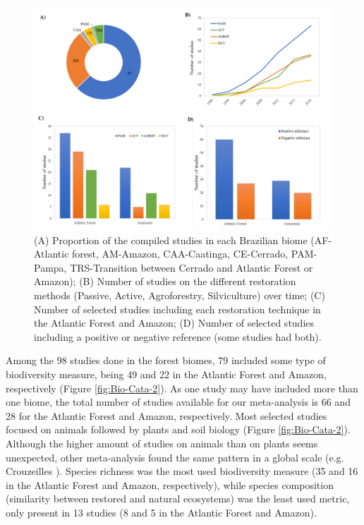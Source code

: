 %
\begin{figure}[H]
\includegraphics[width=1.0\linewidth]{pictureve/Bio-Cata-1.pdf}
\caption{(A) Proportion of the compiled studies in each Brazilian biome (AF-Atlantic forest, AM-Amazon, CAA-Caatinga, CE-Cerrado, PAM-Pampa, TRS-Transition between Cerrado and Atlantic Forest or Amazon); (B) Number of studies on the different restoration methods (Passive, Active, Agroforestry, Silviculture) over time; (C) Number of selected studies including each restoration technique in the Atlantic Forest and Amazon; (D) Number of selected studies including a positive or negative reference (some studies had both).}
\label{fig:Bio-Cata-1}
\end{figure}
%

\newpage
Among the 98 studies done in the forest biomes, 79 included some type of biodiversity measure, being 49 and 22 in the Atlantic Forest and Amazon, respectively (Figure \ref{fig:Bio-Cata-2}). As one study may have included more than one biome, the total number of studies available for our meta-analysis is 66 and 28 for the Atlantic Forest and Amazon, respectively. Most selected studies focused on animals followed by plants and soil biology (Figure \ref{fig:Bio-Cata-2}). Although the higher amount of studies on animals than on plants seems unexpected, other meta-analysis found the same pattern in a global scale (e.g. Crouzeilles \citep{Crouzeilles2017a}). Species richness was the most used biodiversity measure (35 and 16 in the Atlantic Forest and Amazon, respectively), while species composition (similarity between restored and natural ecosystems) was the least used metric, only present in 13 studies (8 and 5 in the Atlantic Forest and Amazon).

